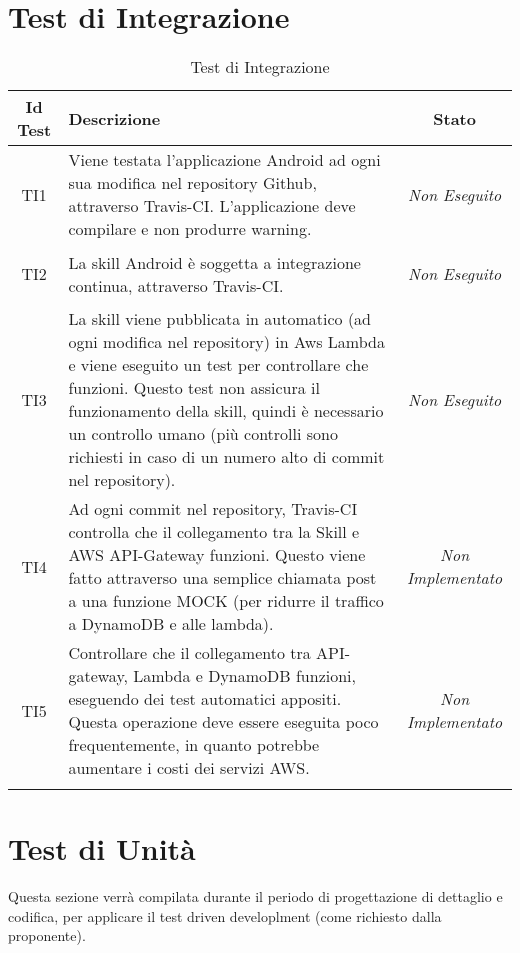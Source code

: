 \section{Test di Integrazione}
\normalsize
\begin{longtable}{|c|>{}m{8cm}|c|}
\hline 
\textbf{Id Test} & \textbf{Descrizione} & \textbf{Stato}\\
\hline
\endhead
\hypertarget{TI1}{TI1} & Viene testata l'applicazione Android ad ogni sua modifica nel repository Github, attraverso Travis-CI. L'applicazione deve compilare e non produrre warning. & \textit{Non Eseguito}\\ \hline
\hypertarget{TI2}{TI2} & La skill Android è soggetta a integrazione continua, attraverso Travis-CI. & \textit{Non Eseguito}\\ \hline
\hypertarget{TI3}{TI3} & La skill viene pubblicata in automatico (ad ogni modifica nel repository) in Aws Lambda e viene eseguito un test per controllare che funzioni. Questo test non assicura il funzionamento della skill, quindi è necessario un controllo umano (più controlli sono richiesti in caso di un numero alto di commit nel repository). & \textit{Non Eseguito}\\ \hline
\hypertarget{TI4}{TI4} & Ad ogni commit nel repository, Travis-CI controlla che il collegamento tra la Skill e AWS API-Gateway funzioni. Questo viene fatto attraverso una semplice chiamata post a una funzione MOCK (per ridurre il traffico a DynamoDB e alle lambda). & \textit{Non Implementato}\\ \hline
\hypertarget{TI5}{TI5} & Controllare che il collegamento tra API-gateway, Lambda e DynamoDB funzioni, eseguendo dei test automatici appositi. Questa operazione deve essere eseguita poco frequentemente, in quanto potrebbe aumentare i costi dei servizi AWS. & \textit{Non Implementato}\\ \hline
\caption[Test di Integrazione]{Test di Integrazione}
\label{tabella:test2}
\end{longtable}
\clearpage

\section{Test di Unità}
Questa sezione verrà compilata durante il periodo di progettazione di dettaglio e codifica, per applicare il test driven developlment (come richiesto dalla proponente).